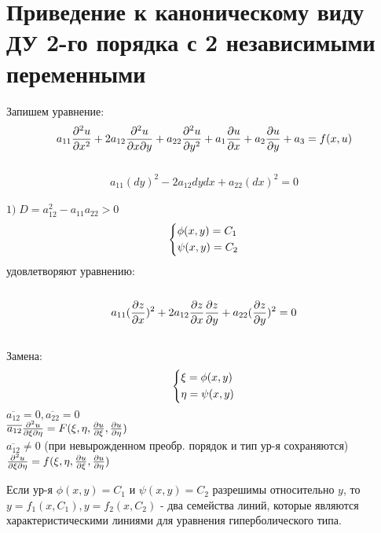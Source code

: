 \documentclass[../main.tex]{subfiles}
\begin{document}
\section{Приведение к каноническому виду ДУ 2-го порядка с 2 независимыми переменными}
Запишем уравнение:
\begin{equation}\label{eq:1.7.1}
	a_{11}\frac{\partial^2u}{\partial x^2} + 2a_{12}\frac{\partial^2u}{\partial x \partial y} + a_{22}\frac{\partial^2u}{\partial y^2} + a_1\frac{\partial u}{\partial x} +a_2\frac{\partial u}{\partial y}+a_3 = f(x,u) \end{equation} \\
\begin{equation}
	a_{11}(dy)^2 - 2a_{12}dydx + a_22(dx)^2 = 0 \end{equation} \\
$1)\;D = a_{12}^2 - a_{11}a_{22} > 0$
$$\begin{dcases}\phi(x,y) = C_1 \\ \psi(x,y) = C_2\end{dcases}$$ удовлетворяют уравнению:
\\ \\
\begin{equation}\label{eq:1.7.2}
	a_{11}(\frac{\partial z}{\partial x})^2 + 2a_{12}\frac{\partial z}{\partial x}\frac{\partial z}{\partial y} + a_{22}(\frac{\partial z}{\partial y})^2 = 0
\end{equation}
\\
Замена:
$$\begin{dcases}\xi = \phi(x,y) \\ \eta = \psi(x,y) \end{dcases}$$
$\overline{a_{12}} = 0, \overline{a_{22}}=0$ \\
$\overline{a_{12}}\frac{\partial^2u}{\partial\xi\partial\eta}=F(\xi, \eta, \frac{\partial u}{\partial \xi}, \frac{\partial u}{\partial \eta})$ \\
$\overline{a_{12}}\neq0$ (при невырожденном преобр. порядок и тип ур-я сохраняются) \\
$\frac{\partial^2u}{\partial\xi\partial\eta}=f(\xi, \eta, \frac{\partial u}{\partial \xi}, \frac{\partial u}{\partial \eta})$ \\
\par Если ур-я $\phi(x,y) = C_1$ и $\psi(x,y)=C_2$ разрешимы относительно $y$, то $y=f_1(x, C_1), y=f_2(x, C_2)$ - два семейства линий, которые являются характеристическими линиями для уравнения гиперболического типа. \\
\end{document}
